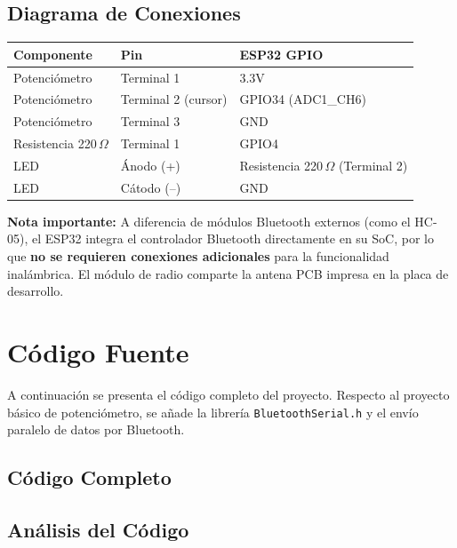 \documentclass[12pt,a4paper]{article}
\begin{document}
\subsection{Diagrama de Conexiones}

\begin{center}
\begin{tabular}{lll}
\toprule
\textbf{Componente} & \textbf{Pin} & \textbf{ESP32 GPIO} \\
\midrule
Potenciómetro & Terminal 1 & 3.3V \\
Potenciómetro & Terminal 2 (cursor) & GPIO34 (ADC1\_CH6) \\
Potenciómetro & Terminal 3 & GND \\
Resistencia 220\,$\Omega$ & Terminal 1 & GPIO4 \\
LED & Ánodo (+) & Resistencia 220\,$\Omega$ (Terminal 2) \\
LED & Cátodo (--) & GND \\
\bottomrule
\end{tabular}
\end{center}

\textbf{Nota importante:} A diferencia de módulos Bluetooth externos (como el HC-05), el ESP32 integra el controlador Bluetooth directamente en su SoC, por lo que \textbf{no se requieren conexiones adicionales} para la funcionalidad inalámbrica. El módulo de radio comparte la antena PCB impresa en la placa de desarrollo.

\section{Código Fuente}

A continuación se presenta el código completo del proyecto. Respecto al proyecto básico de potenciómetro, se añade la librería \texttt{BluetoothSerial.h} y el envío paralelo de datos por Bluetooth.

\subsection{Código Completo}


\subsection{Análisis del Código}
\end{document}
